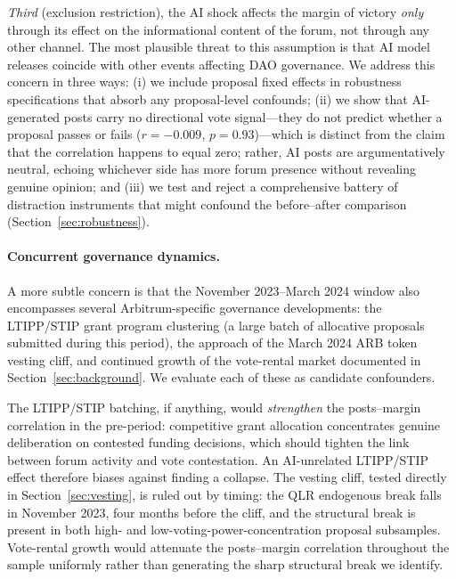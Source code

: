 \documentclass[12pt]{article}
\begin{document}
\emph{Third} (exclusion restriction), the AI shock affects the margin of victory
\emph{only} through its effect on the informational content of the forum, not
through any other channel. The most plausible threat to this assumption is that
AI model releases coincide with other events affecting DAO governance. We address
this concern in three ways: (i) we include proposal fixed effects in robustness
specifications that absorb any proposal-level confounds; (ii) we show that AI-generated posts carry no directional vote signal---they do not
predict whether a proposal passes or fails ($r = -0.009$, $p = 0.93$)---which is
distinct from the claim that the correlation happens to equal zero; rather,
AI posts are argumentatively neutral, echoing whichever side has more forum
presence without revealing genuine opinion; and (iii) we test and reject a comprehensive battery of distraction
instruments that might confound the before--after comparison (Section~\ref{sec:robustness}).

\paragraph{Concurrent governance dynamics.}
A more subtle concern is that the November 2023--March 2024 window also encompasses
several Arbitrum-specific governance developments: the LTIPP/STIP grant program
clustering (a large batch of allocative proposals submitted during this period),
the approach of the March 2024 ARB token vesting cliff, and continued growth of
the vote-rental market documented in Section~\ref{sec:background}. We evaluate
each of these as candidate confounders.

The LTIPP/STIP batching, if anything, would \emph{strengthen} the posts--margin
correlation in the pre-period: competitive grant allocation concentrates genuine
deliberation on contested funding decisions, which should tighten the link between
forum activity and vote contestation. An AI-unrelated LTIPP/STIP effect therefore
biases against finding a collapse. The vesting cliff, tested directly in
Section~\ref{sec:vesting}, is ruled out by timing: the QLR endogenous break
falls in November 2023, four months before the cliff, and the structural break
is present in both high- and low-voting-power-concentration proposal subsamples.
Vote-rental growth would attenuate the posts--margin correlation throughout the
sample uniformly rather than generating the sharp structural break we identify.
\end{document}
